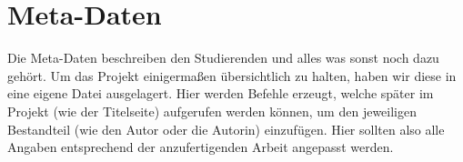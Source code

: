 
\chapter{Meta-Daten}

Die Meta-Daten beschreiben den Studierenden und alles was sonst noch dazu gehört. 
Um das Projekt einigermaßen übersichtlich zu halten, haben wir diese in eine eigene Datei ausgelagert. 
Hier werden Befehle erzeugt, welche später im Projekt (wie der Titelseite) aufgerufen werden können, um den jeweiligen Bestandteil (wie den Autor oder die Autorin) einzufügen. 
Hier sollten also alle Angaben entsprechend der anzufertigenden Arbeit angepasst werden.
